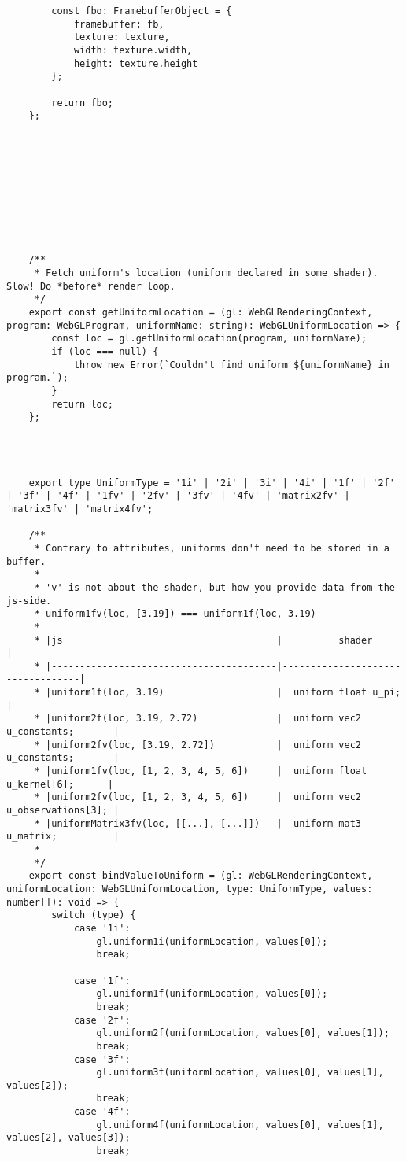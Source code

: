 \begin{lstlisting}
        const fbo: FramebufferObject = {
            framebuffer: fb,
            texture: texture,
            width: texture.width,
            height: texture.height
        };
    
        return fbo;
    };
    
    
    
    
    
    
    
    
    
    
    /**
     * Fetch uniform's location (uniform declared in some shader). Slow! Do *before* render loop.
     */
    export const getUniformLocation = (gl: WebGLRenderingContext, program: WebGLProgram, uniformName: string): WebGLUniformLocation => {
        const loc = gl.getUniformLocation(program, uniformName);
        if (loc === null) {
            throw new Error(`Couldn't find uniform ${uniformName} in program.`);
        }
        return loc;
    };
    
    
    
    
    export type UniformType = '1i' | '2i' | '3i' | '4i' | '1f' | '2f' | '3f' | '4f' | '1fv' | '2fv' | '3fv' | '4fv' | 'matrix2fv' | 'matrix3fv' | 'matrix4fv';
    
    /**
     * Contrary to attributes, uniforms don't need to be stored in a buffer.
     *
     * 'v' is not about the shader, but how you provide data from the js-side.
     * uniform1fv(loc, [3.19]) === uniform1f(loc, 3.19)
     *
     * |js                                      |          shader                  |
     * |----------------------------------------|----------------------------------|
     * |uniform1f(loc, 3.19)                    |  uniform float u_pi;             |
     * |uniform2f(loc, 3.19, 2.72)              |  uniform vec2 u_constants;       |
     * |uniform2fv(loc, [3.19, 2.72])           |  uniform vec2 u_constants;       |
     * |uniform1fv(loc, [1, 2, 3, 4, 5, 6])     |  uniform float u_kernel[6];      |
     * |uniform2fv(loc, [1, 2, 3, 4, 5, 6])     |  uniform vec2 u_observations[3]; |
     * |uniformMatrix3fv(loc, [[...], [...]])   |  uniform mat3 u_matrix;          |
     *
     */
    export const bindValueToUniform = (gl: WebGLRenderingContext, uniformLocation: WebGLUniformLocation, type: UniformType, values: number[]): void => {
        switch (type) {
            case '1i':
                gl.uniform1i(uniformLocation, values[0]);
                break;
    
            case '1f':
                gl.uniform1f(uniformLocation, values[0]);
                break;
            case '2f':
                gl.uniform2f(uniformLocation, values[0], values[1]);
                break;
            case '3f':
                gl.uniform3f(uniformLocation, values[0], values[1], values[2]);
                break;
            case '4f':
                gl.uniform4f(uniformLocation, values[0], values[1], values[2], values[3]);
                break;
    

\end{lstlisting}
